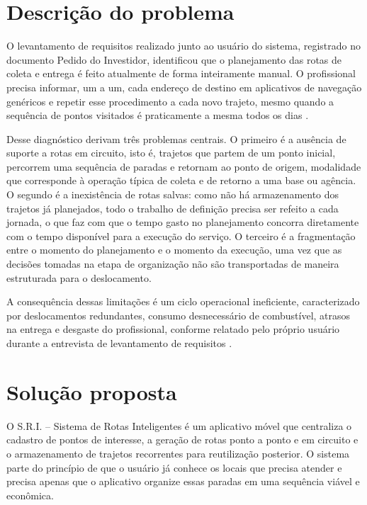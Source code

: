 \section{Descrição do problema}

O levantamento de requisitos realizado junto ao usuário do sistema, registrado no documento Pedido do Investidor, identificou que o planejamento das rotas de coleta e entrega é feito atualmente de forma inteiramente manual. O profissional precisa informar, um a um, cada endereço de destino em aplicativos de navegação genéricos e repetir esse procedimento a cada novo trajeto, mesmo quando a sequência de pontos visitados é praticamente a mesma todos os dias \cite{sriPedido2025}.

Desse diagnóstico derivam três problemas centrais. O primeiro é a ausência de suporte a rotas em circuito, isto é, trajetos que partem de um ponto inicial, percorrem uma sequência de paradas e retornam ao ponto de origem, modalidade que corresponde à operação típica de coleta e de retorno a uma base ou agência. O segundo é a inexistência de rotas salvas: como não há armazenamento dos trajetos já planejados, todo o trabalho de definição precisa ser refeito a cada jornada, o que faz com que o tempo gasto no planejamento concorra diretamente com o tempo disponível para a execução do serviço. O terceiro é a fragmentação entre o momento do planejamento e o momento da execução, uma vez que as decisões tomadas na etapa de organização não são transportadas de maneira estruturada para o deslocamento.

A consequência dessas limitações é um ciclo operacional ineficiente, caracterizado por deslocamentos redundantes, consumo desnecessário de combustível, atrasos na entrega e desgaste do profissional, conforme relatado pelo próprio usuário durante a entrevista de levantamento de requisitos \cite{sriPedido2025}.

\section{Solução proposta}

O S.R.I. -- Sistema de Rotas Inteligentes é um aplicativo móvel que centraliza o cadastro de pontos de interesse, a geração de rotas ponto a ponto e em circuito e o armazenamento de trajetos recorrentes para reutilização posterior. O sistema parte do princípio de que o usuário já conhece os locais que precisa atender e precisa apenas que o aplicativo organize essas paradas em uma sequência viável e econômica.

